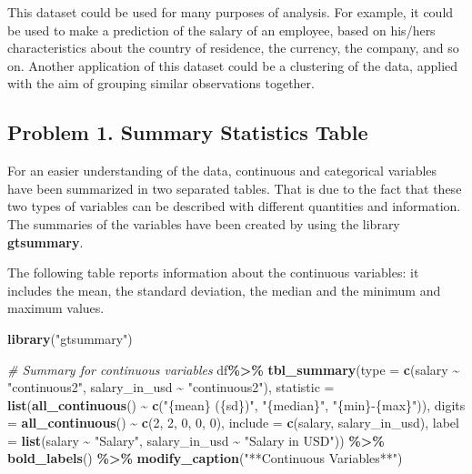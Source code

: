 \documentclass[
]{article}
\newenvironment{Shaded}{\begin{snugshade}}{\end{snugshade}}
\newcommand{\AttributeTok}[1]{\textcolor[rgb]{0.13,0.29,0.53}{#1}}
\newcommand{\CommentTok}[1]{\textcolor[rgb]{0.56,0.35,0.01}{\textit{#1}}}
\newcommand{\DecValTok}[1]{\textcolor[rgb]{0.00,0.00,0.81}{#1}}
\newcommand{\FunctionTok}[1]{\textcolor[rgb]{0.13,0.29,0.53}{\textbf{#1}}}
\newcommand{\NormalTok}[1]{#1}
\newcommand{\SpecialCharTok}[1]{\textcolor[rgb]{0.81,0.36,0.00}{\textbf{#1}}}
\newcommand{\StringTok}[1]{\textcolor[rgb]{0.31,0.60,0.02}{#1}}
\begin{document}
This dataset could be used for many purposes of analysis. For example,
it could be used to make a prediction of the salary of an employee,
based on his/hers characteristics about the country of residence, the
currency, the company, and so on. Another application of this dataset
could be a clustering of the data, applied with the aim of grouping
similar observations together.

\hypertarget{problem-1.-summary-statistics-table}{%
\subsection{Problem 1. Summary Statistics
Table}\label{problem-1.-summary-statistics-table}}

For an easier understanding of the data, continuous and categorical
variables have been summarized in two separated tables. That is due to
the fact that these two types of variables can be described with
different quantities and information. The summaries of the variables
have been created by using the library \textbf{gtsummary}.

The following table reports information about the continuous variables:
it includes the mean, the standard deviation, the median and the minimum
and maximum values. \newline

\begin{Shaded}
\begin{Highlighting}[]
\FunctionTok{library}\NormalTok{(}\StringTok{"gtsummary"}\NormalTok{)}

\CommentTok{\# Summary for continuous variables}
\NormalTok{df}\SpecialCharTok{\%\textgreater{}\%} 
  \FunctionTok{tbl\_summary}\NormalTok{(}\AttributeTok{type =} \FunctionTok{c}\NormalTok{(salary }\SpecialCharTok{\textasciitilde{}} \StringTok{"continuous2"}\NormalTok{, salary\_in\_usd }\SpecialCharTok{\textasciitilde{}} \StringTok{"continuous2"}\NormalTok{), }
              \AttributeTok{statistic =} \FunctionTok{list}\NormalTok{(}\FunctionTok{all\_continuous}\NormalTok{() }\SpecialCharTok{\textasciitilde{}} \FunctionTok{c}\NormalTok{(}\StringTok{"\{mean\} (\{sd\})"}\NormalTok{, }
                                                    \StringTok{"\{median\}"}\NormalTok{, }\StringTok{"\{min\}{-}\{max\}"}\NormalTok{)),}
              \AttributeTok{digits =} \FunctionTok{all\_continuous}\NormalTok{() }\SpecialCharTok{\textasciitilde{}} \FunctionTok{c}\NormalTok{(}\DecValTok{2}\NormalTok{, }\DecValTok{2}\NormalTok{, }\DecValTok{0}\NormalTok{, }\DecValTok{0}\NormalTok{, }\DecValTok{0}\NormalTok{), }
              \AttributeTok{include =} \FunctionTok{c}\NormalTok{(salary, salary\_in\_usd),}
              \AttributeTok{label =} \FunctionTok{list}\NormalTok{(salary }\SpecialCharTok{\textasciitilde{}} \StringTok{"Salary"}\NormalTok{, salary\_in\_usd }\SpecialCharTok{\textasciitilde{}} \StringTok{"Salary in USD"}\NormalTok{)) }\SpecialCharTok{\%\textgreater{}\%}
  \FunctionTok{bold\_labels}\NormalTok{() }\SpecialCharTok{\%\textgreater{}\%}
  \FunctionTok{modify\_caption}\NormalTok{(}\StringTok{"**Continuous Variables**"}\NormalTok{)}
\end{Highlighting}
\end{Shaded}
\end{document}
